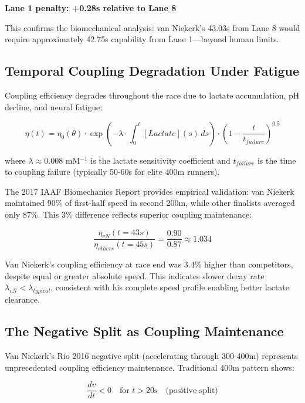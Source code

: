 \textbf{Lane 1 penalty: +0.28s relative to Lane 8}

This confirms the biomechanical analysis: van Niekerk's 43.03s from Lane 8 would require approximately 42.75s capability from Lane 1—beyond human limits.

\subsection{Temporal Coupling Degradation Under Fatigue}

Coupling efficiency degrades throughout the race due to lactate accumulation, pH decline, and neural fatigue:

\begin{equation}
\eta(t) = \eta_0(\theta) \cdot \exp\left(-\lambda \cdot \int_0^t [Lactate](s) \, ds\right) \cdot \left(1 - \frac{t}{t_{failure}}\right)^{0.5}
\end{equation}

where $\lambda \approx 0.008$ mM$^{-1}$ is the lactate sensitivity coefficient and $t_{failure}$ is the time to coupling failure (typically 50-60s for elite 400m runners).

The 2017 IAAF Biomechanics Report provides empirical validation: van Niekerk maintained 90\% of first-half speed in second 200m, while other finalists averaged only 87\%. This 3\% difference reflects superior coupling maintenance:

\begin{equation}
\frac{\eta_{vN}(t=43s)}{\eta_{others}(t=45s)} = \frac{0.90}{0.87} \approx 1.034
\end{equation}

Van Niekerk's coupling efficiency at race end was 3.4\% higher than competitors, despite equal or greater absolute speed. This indicates slower decay rate $\lambda_{vN} < \lambda_{typical}$, consistent with his complete speed profile enabling better lactate clearance.

\subsection{The Negative Split as Coupling Maintenance}

Van Niekerk's Rio 2016 negative split (accelerating through 300-400m) represents unprecedented coupling efficiency maintenance. Traditional 400m pattern shows:

\begin{equation}
\frac{dv}{dt} < 0 \quad \text{for } t > 20\text{s} \quad \text{(positive split)}
\end{equation}

